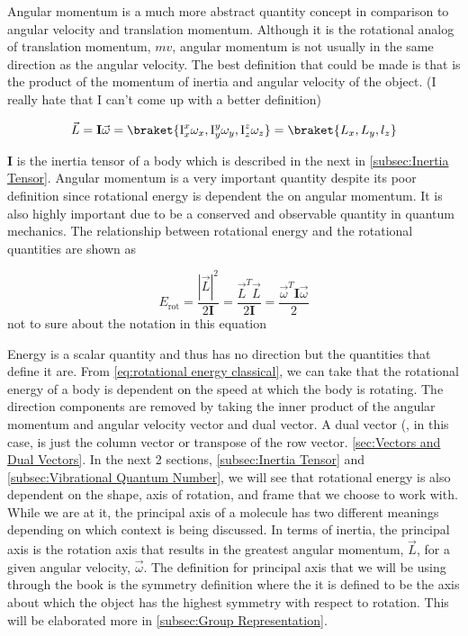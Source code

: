 \documentclass[11pt,a4paper]{book}
\begin{document}
			Angular momentum is a much more abstract quantity concept in comparison to angular velocity and translation momentum. Although it is the rotational analog of translation momentum, $mv$, angular momentum is not usually in the same direction as the angular velocity. The best definition that could be made is that is the product of the momentum of inertia and angular velocity of the object. (I really hate that I can't come up with a better definition)
			
			\begin{equation}
				\label{eq:angular momentum}
				\vec{L}=\textbf{I}\vec{\omega}
				=\braket{\text{I}_{x}^x\omega_x,\text{I}_{y}^y\omega_y,\text{I}_{z}^z\omega_z}=\braket{L_x,L_y,l_z}
			\end{equation}
			
			$\textbf{I}$ is the inertia tensor of a body which is described in the next in \autoref{subsec:Inertia Tensor}. Angular momentum is a very important quantity despite its poor definition since rotational energy is dependent the on angular momentum. It is also highly important due to be a conserved and observable quantity in quantum mechanics. The relationship between rotational energy and the rotational quantities are shown as
			
			\begin{equation}
				\label{eq:rotational energy classical}
				E_{\text{rot}} = \dfrac{|\vec{L}|^2}{2\textbf{I}} = \dfrac{\vec{L}^T \vec{L}}{2\textbf{I}} = \dfrac{\vec{\omega}^T\textbf{I}\vec{\omega}}{2}
			\end{equation}
			not to sure about the notation in this equation 
			
			\noindent
			Energy is a scalar quantity and thus has no direction but the quantities that define it are. From \autoref{eq:rotational energy classical}, we can take that the rotational energy of a body is dependent on the speed at which the body is rotating. The direction components are removed by taking the inner product of the angular momentum and angular velocity vector and dual vector. A dual vector (, in this case, is just the column vector or transpose of the row vector. \autoref{sec:Vectors and Dual Vectors}. In the next 2 sections, \autoref{subsec:Inertia Tensor} and \autoref{subsec:Vibrational Quantum Number}, we will see that rotational energy is also dependent on the shape, axis of rotation, and frame that we choose to work with. While we are at it, the principal axis of a molecule has two different meanings depending on which context is being discussed. In terms of inertia, the principal axis is the rotation axis that results in the greatest angular momentum, $\vec{L}$, for a given angular velocity, $\vec{\omega}$. The definition for principal axis that we will be using through the book is the symmetry definition where the it is defined to be the axis about which the object has the highest symmetry with respect to rotation. This will be elaborated more in \autoref{subsec:Group Representation}.
\end{document}
